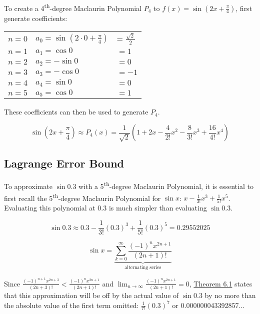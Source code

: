 \documentclass[10pt]{article}
\theoremstyle{definition}
\begin{document}
\newpage

To create a 4\textsuperscript{th}-degree Maclaurin Polynomial $P_4$ to $f(x)=\sin (2x+\frac{\pi}{4})$, first generate coefficients:

\begin{center}
\begin{tabular}{l l l}
$n=0$    &$a_0=\sin (2\cdot 0 +\frac{\pi}{4})$ &= $\frac{\sqrt{2}}{2}$ \\
$n=1$    &$a_1=\cos 0$ & $= 1$ \\
$n=2$    &$a_2=-\sin 0$ & $= 0$ \\
$n=3$    &$a_3=-\cos 0$ & $= -1$ \\
$n=4$    &$a_4=\sin 0$ & $= 0$ \\
$n=5$    &$a_5=\cos 0$ & $= 1$ \\
\end{tabular}
\end{center}

These coefficients can then be used to generate $P_4$.

\begin{equation}
\label{eq:1}
\sin \left(2x+\frac{\pi}{4}\right) \approx P_4(x)=\frac{1}{\sqrt{2}}\left(1+2x-\frac{4}{2!}x^2-\frac{8}{3!}x^3+\frac{16}{4!}x^4\right)
\end{equation}

\subsection{Lagrange Error Bound}

To approximate $\sin 0.3$ with a 5\textsuperscript{th}-degree Maclaurin Polynomial, it is essential to first recall the 5\textsuperscript{th}-degree Maclaurin Polynomial for $\sin x$: $x- \frac{1}{3!}x^3 + \frac{1}{5!}x^5$. Evaluating this polynomial at 0.3 is much simpler than evaluating $\sin 0.3$.

\[\sin 0.3 \approx 0.3-\frac{1}{3!}(0.3)^3+\frac{1}{5!}(0.3)^5 = 0.29552025\]

\[\sin x = \underbrace{\sum_{k=0}^{\infty} \frac{(-1)^nx^{2n+1}}{(2n+1)!}}_{\text{alternating series}}\]

Since $\frac{(-1)^{n+1}x^{2n+3}}{(2n+3)!}<\frac{(-1)^nx^{2n+1}}{(2n+1)!}$ and $\lim_{n \to \infty} \frac{(-1)^nx^{2n+1}}{(2n+1)!}=0$, \hyperlink{Error Bound}{Theorem 6.1} states that this approximation will be off by the actual value of $\sin 0.3$ by no more than the absolute value of the first term omitted: $\frac{1}{7!}(0.3)^7$ or 0.000000043392857...
\end{document}
